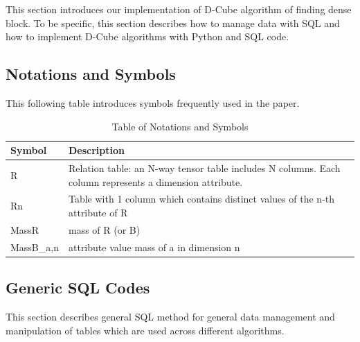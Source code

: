 This section introduces our implementation of D-Cube algorithm of finding dense block. To be specific, this section describes how to manage data with SQL and how to implement D-Cube algorithms with Python and SQL code.
\subsection{Notations and Symbols}
This following table introduces symbols frequently used in the paper.
 
\begin{table}[h!]
\centering
\begin{tabular}{|p{3cm}|p{10cm}|}
 \hline
 Symbol & Description \\ [0.5ex] 
 \hline\hline
 R & Relation table: an N-way tensor table includes N columns.  Each column represents a dimension attribute. \\
 \hline
 Rn & Table with 1 column which contains distinct values of the n-th attribute of R \\ 
 \hline
 MassR & mass of R (or B) \\ 
 \hline
 MassB_{a,n} & attribute value mass of a in dimension n \\[1ex]
 \hline
\end{tabular}
\caption{Table of Notations and Symbols}
\label{table:1}
\end{table}

\subsection{Generic SQL Codes}
This section describes general SQL method for general data management and manipulation of tables which are used across different algorithms.

